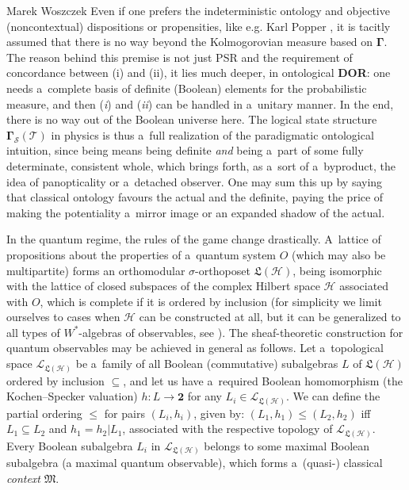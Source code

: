 \begin{artengenv}{Marek Woszczek}
Even if one prefers the indeterministic ontology and objective (noncontextual) dispositions or propensities, like e.g. Karl Popper
\parencite*[][]{popper_quantum_1967}, %
 it is tacitly assumed that there is no way beyond the Kolmogorovian measure based on $\bm{\Gamma}$. The reason behind this premise is not just PSR and the requirement of concordance between (i) and (ii), it lies much deeper, in ontological \textbf{DOR}: one needs a~complete basis of definite (Boolean) elements for the probabilistic measure, and then (\textit{i}) and (\textit{ii}) can be handled in a~unitary manner. In the end, there is no way out of the Boolean universe here. The logical state structure $\bm{\Gamma}_{\mathcal{S}}(\mathcal{T})$ in physics is thus a~full realization of the paradigmatic ontological intuition, since being means being definite \textit{and} being a~part of some fully determinate, consistent whole, which brings forth, as a~sort of a~byproduct, the idea of panopticality or a~detached observer. One may sum this up by saying that classical ontology favours the actual and the definite, paying the price of making the potentiality a~mirror image or an expanded shadow of the actual.

In the quantum regime, the rules of the game change drastically. A~lattice of propositions about the properties of a~quantum system $O$ (which may also be multipartite) forms an orthomodular $\sigma $-orthoposet $\bm{\mathfrak{L}}(\mathcal{H})$, being isomorphic with the lattice of closed subspaces of the complex Hilbert space $\mathcal{H}$ associated with $O$, which is complete if it is ordered by inclusion (for simplicity we limit ourselves to cases when $\mathcal{H}$ can be constructed at all, but it can be generalized to all types of $W^{\ast}$-algebras of observables, see
\parencite[][]{doring_kochenspecker_2005}%
). The sheaf-theoretic construction for quantum observables may be achieved in general as follows. Let a~topological space $\mathcal{L}_{\bm{\mathfrak{L}}(\mathcal{H})}$ be a~family of all Boolean (commutative) subalgebras $L$ of $\bm{\mathfrak{L}}(\mathcal{H})$ ordered by inclusion ${\subseteq}$, and let us have a~required Boolean homomorphism (the Kochen–Specker valuation) $h:L\to \bm{2}$ for any $L_i{\in}\mathcal{L}_{\bm{\mathfrak{L}}(\mathcal{H})}$. We can define the partial ordering $\leq$ for pairs $(L_i,h_i)$, given by: $(L_1,h_1){\leq}\left(L_2,h_2\right)$ iff $L_1{\subseteq}L_2$ and $\left.h_1=h_2\right|L_1$, associated with the respective topology of $\mathcal{L}_{\bm{\mathfrak{L}}(\mathcal{H})}$. Every Boolean subalgebra $L_i$ in $\mathcal{L}_{\bm{\mathfrak{L}}(\mathcal{H})}$ belongs to some maximal Boolean subalgebra (a maximal quantum observable), which forms a~(quasi-) classical \textit{context} $\bm{\mathfrak{M}}$.


\end{artengenv}
